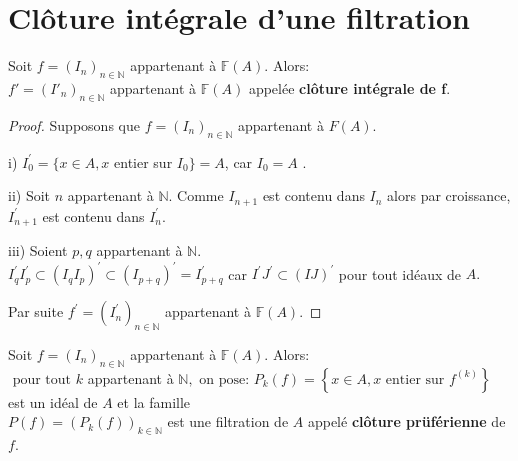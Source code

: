 \section{Clôture intégrale d'une filtration}
\begin{madefinition_proposition}
	Soit $f=(I_n)_{n\in \mathbb{N}} $ appartenant à $ \mathbb{F}(A).$ Alors:\\
	$f'=(I'_n)_{n\in \mathbb{N}} $ appartenant à $ \mathbb{F}(A)$ appelée \textbf{clôture intégrale de f}.
\end{madefinition_proposition}
\begin{proof}
	Supposons que $f=(I_{n})_{n\in \mathbb{N}}$ appartenant à $ F(A).$
	
	i) $I_{0}^{\prime }=\{x\in A,x$ entier sur $I_{0}\}=A$, car $I_{0}=A$ $.$
	
	ii) Soit $n$ appartenant à $ \mathbb{N}.$
	Comme $I_{n+1}$ est contenu dans $  I_{n}$ alors par croissance, $I_{n+1}^{\prime }$ est contenu dans $ I_{n}^{\prime }.$
	
	iii) Soient $p,q$ appartenant à $ \mathbb{N}.$ \\
	$I_{q}^{\prime }I_{p}^{\prime }\subset (I_{q}I_{p})^{\prime }\subset (I_{p+q})^{\prime }=I_{p+q}^{\prime }$ car $I^{\prime }J^{\prime }\subset (IJ)^{\prime }$ pour tout idéaux de $A.$
	
	Par suite $f^{\prime }=(I_{n}^{\prime })_{n\in \mathbb{N}}$ appartenant à $ \mathbb{F}(A).$
\end{proof}
\begin{moncorollaire}
	Soit $f=(I_n)_{n \in \mathbb{N}} $ appartenant à $ \mathbb{F}(A)$. Alors:\\
	$\text{ pour tout } k $ appartenant à $ \mathbb{N}, \text{ on pose: } P_k(f)=\left\{x \in A, x \text{ entier sur } f^{(k)}\right\}$ est un idéal de $A$ et la famille \\ $P(f)=(P_k(f))_{k \in \mathbb{N}}$ est une filtration de $A$ appelé \textbf{clôture prüférienne} de $f$.
\end{moncorollaire}
